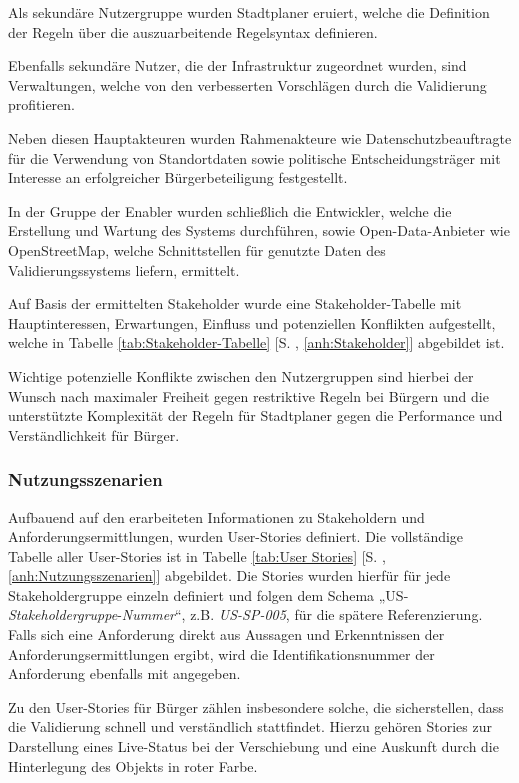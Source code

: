 Als sekundäre Nutzergruppe wurden Stadtplaner eruiert, welche die Definition der Regeln über die auszuarbeitende Regelsyntax definieren.

Ebenfalls sekundäre Nutzer, die der Infrastruktur zugeordnet wurden, sind Verwaltungen, welche von den verbesserten Vorschlägen durch die Validierung profitieren.

Neben diesen Hauptakteuren wurden Rahmenakteure wie Datenschutzbeauftragte für die Verwendung von Standortdaten sowie politische Entscheidungsträger mit Interesse an erfolgreicher Bürgerbeteiligung festgestellt.

In der Gruppe der Enabler wurden schließlich die Entwickler, welche die Erstellung und Wartung des Systems durchführen, sowie Open-Data-Anbieter wie OpenStreetMap, welche Schnittstellen für genutzte Daten des Validierungssystems liefern, ermittelt.

\medskip

Auf Basis der ermittelten Stakeholder wurde eine Stakeholder-Tabelle mit Hauptinteressen, Erwartungen, Einfluss und potenziellen Konflikten aufgestellt, welche in Tabelle \ref{tab:Stakeholder-Tabelle} [S. \pageref{tab:Stakeholder-Tabelle}, \ref{anh:Stakeholder}] abgebildet ist.

Wichtige potenzielle Konflikte zwischen den Nutzergruppen sind hierbei der Wunsch nach maximaler Freiheit gegen restriktive Regeln bei Bürgern und die unterstützte Komplexität der Regeln für Stadtplaner gegen die Performance und Verständlichkeit für Bürger.

\subsubsection{Nutzungsszenarien}

Aufbauend auf den erarbeiteten Informationen zu Stakeholdern und Anforderungsermittlungen, wurden User-Stories definiert. Die vollständige Tabelle aller User-Stories ist in Tabelle \ref{tab:User Stories} [S. \pageref{tab:User Stories}, \ref{anh:Nutzungsszenarien}] abgebildet. Die Stories wurden hierfür für jede Stakeholdergruppe einzeln definiert und folgen dem Schema „US-\textit{Stakeholdergruppe}-\textit{Nummer}“, z.B. \textit{US-SP-005}, für die spätere Referenzierung. Falls sich eine Anforderung direkt aus Aussagen und Erkenntnissen der Anforderungsermittlungen ergibt, wird die Identifikationsnummer der Anforderung ebenfalls mit angegeben.

Zu den User-Stories für Bürger zählen insbesondere solche, die sicherstellen, dass die Validierung schnell und verständlich stattfindet. Hierzu gehören Stories zur Darstellung eines Live-Status bei der Verschiebung und eine Auskunft durch die Hinterlegung des Objekts in roter Farbe.

